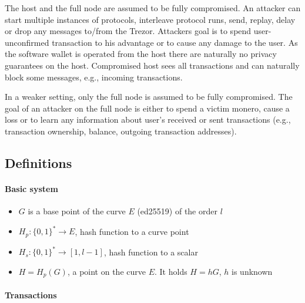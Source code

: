 \documentclass[]{article}
\begin{document}
The host and the full node are assumed to be fully compromised. An attacker can start multiple instances of protocols, interleave protocol runs, send, replay, delay or drop any messages to/from the Trezor. Attackers goal is to spend user-unconfirmed transaction to his advantage or to cause any damage to the user. As the software wallet is operated from the host there are naturally no privacy guarantees on the host. Compromised host sees all transactions and can naturally block some messages, e.g., incoming transactions. 

In a weaker setting, only the full node is assumed to be fully compromised. The goal of an attacker on the full node is either to spend a victim monero, cause a loss or to learn any information about user's received or sent transactions (e.g., transaction ownership, balance, outgoing transaction addresses).
 
\subsection{Definitions}

\paragraph{Basic system}

\begin{itemize}
	\item $G$ is a base point of the curve $E$ (ed25519) of the order $l$
	\item $H_p : \{0,1\}^* \rightarrow E$, hash function to a curve point
	\item $H_s : \{0,1\}^* \rightarrow [1, l-1]$, hash function to a scalar
	\item $H = H_p(G)$, a point on the curve $E$. It holds $H=hG$, $h$ is unknown
	
\end{itemize}

\paragraph{Transactions}
\end{document}
